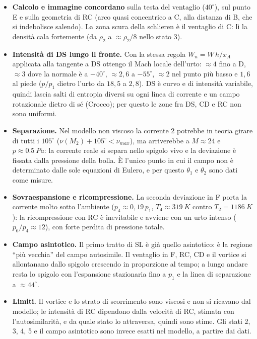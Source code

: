 \documentclass[11pt,a4paper]{article}
\begin{document}
\begin{itemize}
  \item \textbf{Calcolo e immagine concordano} sulla testa del ventaglio ($40^\circ$), sul punto E e sulla geometria
  di RC (arco quasi concentrico a C, alla distanza di B, che si indebolisce salendo). La zona scura della schlieren è il
  ventaglio di C: lì la densità cala fortemente (da $\rho_2$ a $\approx\rho_2/8$ nello stato 3).
  \item \textbf{Intensità di DS lungo il fronte.} Con la stessa regola $W_n=W\,h/x_A$ applicata alla tangente a DS
  ottengo il Mach locale dell'urto: $\approx4$ fino a D, $\approx3$ dove la normale è a $-40^\circ$, $\approx2{,}6$ a
  $-55^\circ$, $\approx2$ nel punto più basso e $1{,}6$ al piede ($p/p_1$ dietro l'urto da $18{,}5$ a $2{,}8$). DS è
  curvo e di intensità variabile, quindi lascia salti di entropia diversi su ogni linea di corrente e un campo
  rotazionale dietro di sé (Crocco); per questo le zone fra DS, CD e RC non sono uniformi.
  \item \textbf{Separazione.} Nel modello non viscoso la corrente 2 potrebbe in teoria girare di tutti i $105^\circ$
  ($\nu(M_2)+105^\circ<\nu_{max}$), ma arriverebbe a $M\approx24$ e $p\approx\SI{0.5}{Pa}$: la corrente reale si separa
  nello spigolo vivo e la deviazione è fissata dalla pressione della bolla. È l'unico punto in cui il campo non è
  determinato dalle sole equazioni di Eulero, e per questo $\theta_1$ e $\theta_2$ sono dati come misure.
  \item \textbf{Sovraespansione e ricompressione.} La seconda deviazione in F porta la corrente molto sotto
  l'ambiente ($p_4\approx0{,}19\,p_1$, $T_4\approx\SI{319}{K}$ contro $T_2=\SI{1186}{K}$): la ricompressione con RC
  è inevitabile e avviene con un urto intenso ($p_6/p_4\approx12$), con forte perdita di pressione totale.
  \item \textbf{Campo asintotico.} Il primo tratto di SL è già quello asintotico: è la regione ``più vecchia'' del
  campo autosimile. Il ventaglio in F, RC, CD e il vortice si allontanano dallo spigolo crescendo in proporzione al
  tempo; a lungo andare resta lo spigolo con l'espansione stazionaria fino a $p_1$ e la linea di separazione a
  $\approx44^\circ$.
  \item \textbf{Limiti.} Il vortice e lo strato di scorrimento sono viscosi e non si ricavano dal modello; le
  intensità di RC dipendono dalla velocità di RC, stimata con l'autosimilarità, e da quale stato lo attraversa, quindi
  sono stime. Gli stati 2, 3, 4, 5 e il campo asintotico sono invece esatti nel modello, a partire dai dati.
\end{itemize}
\end{document}
